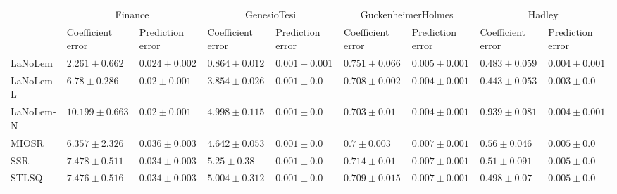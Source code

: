\begin{table*}
{\begin{tabular}{lllllllll}
 & \multicolumn{2}{c}{Finance} & \multicolumn{2}{c}{GenesioTesi} & \multicolumn{2}{c}{GuckenheimerHolmes} & \multicolumn{2}{c}{Hadley} \\
 & Coefficient error & Prediction error & Coefficient error & Prediction error & Coefficient error & Prediction error & Coefficient error & Prediction error \\
\midrule
LaNoLem & $\mathbf{2.261}\pm 0.662$ & $0.024\pm 0.002$ & $\mathbf{0.864}\pm 0.012$ & $0.001\pm 0.001$ & $0.751\pm 0.066$ & $0.005\pm 0.001$ & $0.483\pm 0.059$ & $0.004\pm 0.001$ \\
LaNoLem-L & $6.78\pm 0.286$ & $0.02\pm 0.001$ & $3.854\pm 0.026$ & $0.001\pm 0.0$ & $0.708\pm 0.002$ & $\mathbf{0.004}\pm 0.001$ & $\mathbf{0.443}\pm 0.053$ & $\mathbf{0.003}\pm 0.0$ \\
LaNoLem-N & $10.199\pm 0.663$ & $\mathbf{0.02}\pm 0.001$ & $4.998\pm 0.115$ & $\mathbf{0.001}\pm 0.0$ & $0.703\pm 0.01$ & $0.004\pm 0.001$ & $0.939\pm 0.081$ & $0.004\pm 0.001$ \\
MIOSR & $6.357\pm 2.326$ & $0.036\pm 0.003$ & $4.642\pm 0.053$ & $0.001\pm 0.0$ & $\mathbf{0.7}\pm 0.003$ & $0.007\pm 0.001$ & $0.56\pm 0.046$ & $0.005\pm 0.0$ \\
SSR & $7.478\pm 0.511$ & $0.034\pm 0.003$ & $5.25\pm 0.38$ & $0.001\pm 0.0$ & $0.714\pm 0.01$ & $0.007\pm 0.001$ & $0.51\pm 0.091$ & $0.005\pm 0.0$ \\
STLSQ & $7.476\pm 0.516$ & $0.034\pm 0.003$ & $5.004\pm 0.312$ & $0.001\pm 0.0$ & $0.709\pm 0.015$ & $0.007\pm 0.001$ & $0.498\pm 0.07$ & $0.005\pm 0.0$ \\

\midrule


\end{tabular}}
\end{table*}
